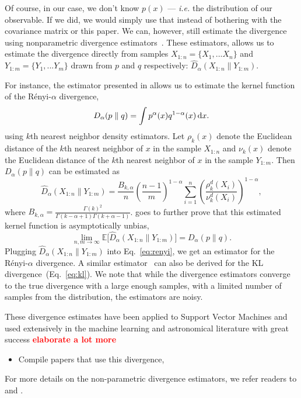 \documentclass[12pt, letterpaper, preprint]{aastex}
\newcommand{\bitem}{\begin{itemize}}
\newcommand{\eitem}{\end{itemize}}
\newcommand{\beq}{\begin{equation}}
\newcommand{\eeq}{\end{equation}}
\newcommand{\todo}[1]{{\bf \textcolor{red}{#1}}}
\begin{document}
Of course, in our case, we don't know $p(x)$ --- \emph{i.e.} the distribution of
our observable. If we did, we would simply use that instead of bothering with 
the covariance matrix or this paper. We can, however, still estimate the 
divergence using nonparametric divergence estimators~\citep{wang2009, poczos2012, krishnamurthy2014}. 
These estimators, allows us to estimate the divergence directly from 
samples $X_{1:n} = \{ X_1, ... X_n \}$ and $Y_{1:m} = \{ Y_1, ... Y_m \}$ 
drawn from $p$ and $q$ respectively: $\hat{D}_{\alpha}(X_{1:n} \parallel Y_{1:m})$. 

For instance, the estimator presented in \cite{poczos2012} allows us to estimate the kernel function 
of the R\'enyi-$\alpha$ divergence,
\beq \label{eq:d_alpha}
D_{\alpha} ( p \parallel q ) = \int p^\alpha(x) q^{1-\alpha}(x)\,{\rm d}x. 
\eeq
using $k$th nearest neighbor density estimators.
Let $\rho_k(x)$ denote the Euclidean distance of the $k$th nearest neighbor 
of $x$ in the sample $X_{1:n}$ and $\nu_k(x)$ denote the Euclidean distance 
of the $k$th nearest neighbor of $x$ in the sample $Y_{1:m}$. Then 
$D_{\alpha}(p \parallel q)$ can be estimated as 
\beq \label{eq:d_alpha_est}
\hat{D}_{\alpha}(X_{1:n} \parallel Y_{1:m}) = \frac{B_{k,\alpha}}{n} \left(\frac{n-1}{m}\right)^{1-\alpha}
\sum\limits_{i=1}^{n} \left(\frac{\rho_k^{d}(X_i)}{\nu_k^{d}(X_i)} \right)^{1-\alpha},
\eeq
where $B_{k, \alpha} = \frac{\Gamma(k)^2}{\Gamma(k-\alpha+1)\Gamma(k+\alpha-1)}$. 
\cite{poczos2012} goes to further prove that this estimated kernel function
is asymptotically unbias,
\beq
\lim_{n, m \rightarrow \infty} \mathbb{E} \big[ \hat{D}_{\alpha} (X_{1:n} \parallel Y_{1:m}) \big] = D_{\alpha} (p \parallel q).
\eeq
Plugging $\hat{D}_{\alpha}(X_{1:n} \parallel Y_{1:m})$ into Eq.~\ref{eq:renyi},
we get an estimator for the R\'enyi-$\alpha$ divergence. A similar estimator~\citep{wang2009} 
can also be derived for the KL divergence~(Eq.~\ref{eq:kl}). 
We note that while the divergence estimators converge to the true divergence with a large
enough samples, with a limited number of samples from the distribution, 
the estimators are noisy. 

These divergence estimates have been applied to Support Vector Machines and used 
extensively in the machine learning and astronomical literature with great success 
\todo{elaborate a lot more} 
\bitem 
    \item Compile papers that use this divergence, \cite{ntampaka2015, ntampaka2016}
\eitem
For more details on the non-parametric divergence estimators, we refer readers to 
\cite{poczos2012} and \cite{krishnamurthy2014}.
\end{document}
